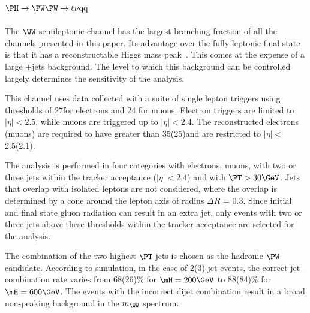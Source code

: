\subsection{$\PH \to \PW\PW \to \ell\nu \rm{qq}$}

The $\WW$ semileptonic channel has the largest branching fraction of
all the channels presented in this paper. Its advantage over the fully
leptonic final state is that it has a reconstructable Higgs mass
peak~\cite{intro2}. This comes at the expense of a large \PW+jets
background. The level to which this background can be controlled
largely determines the sensitivity of the analysis.

This channel uses data collected with a suite of single lepton
triggers using \pt thresholds 
of 27\GeV for electrons and  
24\GeV
for muons.
Electron triggers are limited to
$|\eta| < 2.5$, while muons are triggered up to $|\eta| < 2.4$.
The reconstructed electrons (muons) are required to have 
\PT greater than 35(25)\GeV and are
restricted to $|\eta|<$2.5(2.1). 

The analysis is performed in four categories with electrons, muons, with
two or three jets
within the tracker acceptance
($|\eta|<2.4$) and with $\PT>30\GeV$.
Jets that overlap with isolated leptons are not considered,
where the overlap is determined by a cone around the lepton axis of
radius $\Delta R$ = 0.3. Since initial and final state gluon radiation
can result in an extra jet, only events with two or three jets above
these thresholds within the tracker acceptance are selected for the
analysis.

The combination of the two highest-$\PT$ jets is chosen as the
hadronic $\PW$ candidate.  According to simulation, in the case of 2(3)-jet
events, the correct jet-combination rate varies from 68(26)\% for $\mH = 200\GeV$
to 88(84)\% for $\mH = 600\GeV$.  
The events with
the incorrect dijet combination result in a broad non-peaking
background in the $m_{\WW}$ spectrum.

